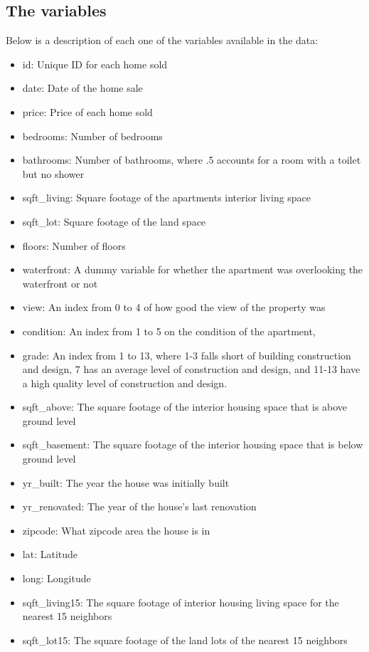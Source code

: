 \documentclass[table]{article}
\providecommand{\tightlist}{%
  \setlength{\itemsep}{0pt}\setlength{\parskip}{0pt}}
\begin{document}
\subsection{The variables}\label{the-variables}

Below is a description of each one of the variables available in the
data:

\begin{itemize}
\tightlist
\item
  id: Unique ID for each home sold
\item
  date: Date of the home sale
\item
  price: Price of each home sold
\item
  bedrooms: Number of bedrooms
\item
  bathrooms: Number of bathrooms, where .5 accounts for a room with a
  toilet but no shower
\item
  sqft\_living: Square footage of the apartments interior living space
\item
  sqft\_lot: Square footage of the land space
\item
  floors: Number of floors
\item
  waterfront: A dummy variable for whether the apartment was overlooking
  the waterfront or not
\item
  view: An index from 0 to 4 of how good the view of the property was
\item
  condition: An index from 1 to 5 on the condition of the apartment,
\item
  grade: An index from 1 to 13, where 1-3 falls short of building
  construction and design, 7 has an average level of construction and
  design, and 11-13 have a high quality level of construction and
  design.
\item
  sqft\_above: The square footage of the interior housing space that is
  above ground level
\item
  sqft\_basement: The square footage of the interior housing space that
  is below ground level
\item
  yr\_built: The year the house was initially built
\item
  yr\_renovated: The year of the house's last renovation
\item
  zipcode: What zipcode area the house is in
\item
  lat: Latitude
\item
  long: Longitude
\item
  sqft\_living15: The square footage of interior housing living space
  for the nearest 15 neighbors
\item
  sqft\_lot15: The square footage of the land lots of the nearest 15
  neighbors
\end{itemize}
\end{document}
